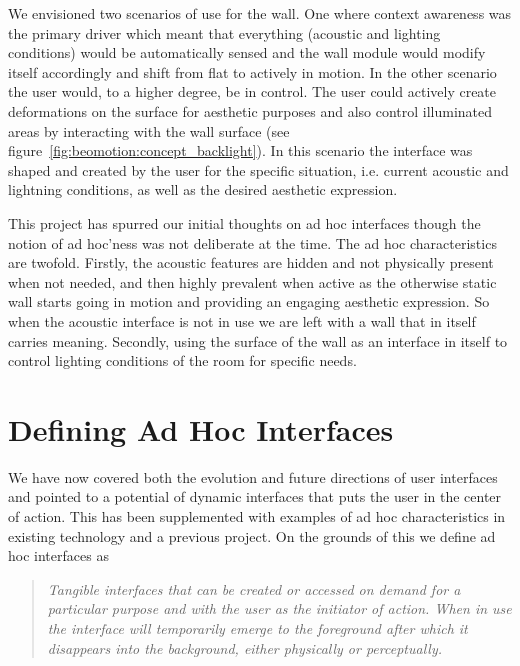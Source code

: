 We envisioned two scenarios of use for the wall.
One where context awareness was the primary driver which meant that everything (acoustic and lighting conditions) would be automatically sensed and the wall module would modify itself accordingly and shift from flat to actively in motion.
In the other scenario the user would, to a higher degree, be in control.
The user could actively create deformations on the surface for aesthetic purposes and also control illuminated areas by interacting with the wall surface (see figure~\ref{fig:beomotion:concept_backlight}).
In this scenario the interface was shaped and created by the user for the specific situation, i.e. current acoustic and lightning conditions, as well as the desired aesthetic expression. 

This project has spurred our initial thoughts on ad hoc interfaces though the notion of ad hoc'ness was not deliberate at the time.
The ad hoc characteristics are twofold.
Firstly, the acoustic features are hidden and not physically present when not needed, and then highly prevalent when active as the otherwise static wall starts going in motion and providing an engaging aesthetic expression.
So when the acoustic interface is not in use we are left with a wall that in itself carries meaning.
Secondly, using the surface of the wall as an interface in itself to control lighting conditions of the room for specific needs.



\section{Defining Ad Hoc Interfaces} 
\label{ch:adhoc:defining-ahi}
We have now covered both the evolution and future directions of user interfaces and pointed to a potential of dynamic interfaces that puts the user in the center of action.
This has been supplemented with examples of ad hoc characteristics in existing technology and a previous project.
On the grounds of this we define ad hoc interfaces as 

\begin{quotation}\label{adhoc:definition}
\emph{Tangible interfaces that can be created or accessed on demand for a particular purpose and with the user as the initiator of action. When in use the interface will temporarily emerge to the foreground after which it disappears into the background, either physically or perceptually.}
\end{quotation}

